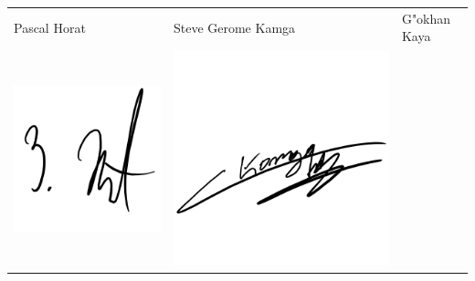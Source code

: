 \documentclass[12pt]{article}
\begin{document}
\begin{tabular}{p{6.5cm}p{6.5cm}p{6.5cm}}
Pascal Horat & Steve Gerome Kamga & G"okhan Kaya\\
\includegraphics[scale=0.6]{unterschriftPascal}&
\includegraphics[scale=0.6]{unterschriftGerome}&

\end{tabular}
\end{document}
